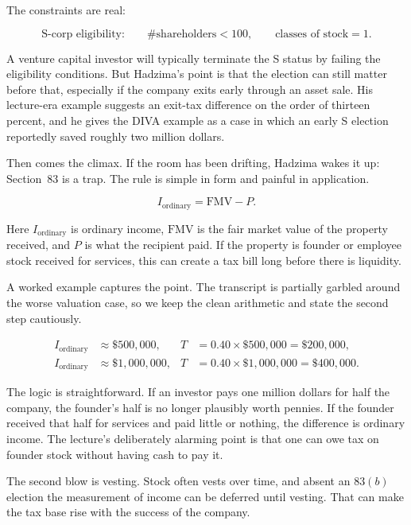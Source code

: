 The constraints are real:

\begin{equation}
\text{S-corp eligibility:}\qquad \#\text{shareholders}<100,\qquad \text{classes of stock}=1.
\end{equation}

A venture capital investor will typically terminate the S status by failing the eligibility conditions. But Hadzima's point is that the election can still matter before that, especially if the company exits early through an asset sale. His lecture-era example suggests an exit-tax difference on the order of thirteen percent, and he gives the DIVA example as a case in which an early S election reportedly saved roughly two million dollars.

Then comes the climax. If the room has been drifting, Hadzima wakes it up: Section~83 is a trap. The rule is simple in form and painful in application.

\begin{equation}
I_{\text{ordinary}}=\mathrm{FMV}-P.
\end{equation}

Here \(I_{\text{ordinary}}\) is ordinary income, \(\mathrm{FMV}\) is the fair market value of the property received, and \(P\) is what the recipient paid. If the property is founder or employee stock received for services, this can create a tax bill long before there is liquidity.

A worked example captures the point. The transcript is partially garbled around the worse valuation case, so we keep the clean arithmetic and state the second step cautiously.

\begin{align}
I_{\text{ordinary}} &\approx \$500{,}000,
&
T &= 0.40\times \$500{,}000=\$200{,}000,\\
I_{\text{ordinary}} &\approx \$1{,}000{,}000,
&
T &= 0.40\times \$1{,}000{,}000=\$400{,}000.
\end{align}

The logic is straightforward. If an investor pays one million dollars for half the company, the founder's half is no longer plausibly worth pennies. If the founder received that half for services and paid little or nothing, the difference is ordinary income. The lecture's deliberately alarming point is that one can owe tax on founder stock without having cash to pay it.

The second blow is vesting. Stock often vests over time, and absent an \(83(b)\) election the measurement of income can be deferred until vesting. That can make the tax base rise with the success of the company.

